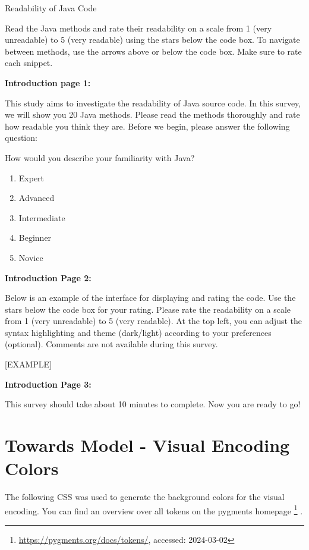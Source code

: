 \documentclass[%
class=scrreprt,
chapterprefix=false,%
open=right,%
twoside=true,%
paper=a4,%
logofile={Logo\_zentral\_farbig\_EN.png},%
thesistype=master,%
UKenglish,%
]{se2thesis}
\newcounter{urlfootnote}
\newcommand{\onecurl}[2]{%
	\stepcounter{urlfootnote}%
	\expandafter\def\csname urlfootnote:#1\endcsname{\theurlfootnote}%
	\footnote{\label{url:#1}\url{#1}, accessed: #2}%
}
\newcommand{\curl}[2]{%
		\onecurl{#1}{#2}%
}
\theoremstyle{definition}
\begin{document}
	Readability of Java Code
	
	Read the Java methods and rate their readability on a scale from 1 (very unreadable) to 5 (very readable) using the stars below the code box. To navigate between methods, use the arrows above or below the code box. Make sure to rate each snippet.
	
	\textbf{Introduction page 1:}
	
	This study aims to investigate the readability of Java source code. In this survey, we will show you 20 Java methods. Please read the methods thoroughly and rate how readable you think they are. Before we begin, please answer the following question:
	
	How would you describe your familiarity with Java?
	\begin{enumerate}
		\item Expert
		\item Advanced
		\item Intermediate
		\item Beginner
		\item Novice
	\end{enumerate}
	
	\pagebreak
	
	\textbf{Introduction Page 2:}
	
	Below is an example of the interface for displaying and rating the code. Use the stars below the code box for your rating. Please rate the readability on a scale from 1 (very unreadable) to 5 (very readable). At the top left, you can adjust the syntax highlighting and theme (dark/light) according to your preferences (optional). Comments are not available during this survey.
	
	[EXAMPLE]
	
	\textbf{Introduction Page 3:}
	
	This survey should take about 10 minutes to complete. Now you are ready to go! 


\chapter{Towards Model - Visual Encoding Colors}\label{appendix:model-visual-colors}	
	The following CSS was used to generate the background colors for the visual encoding. 
	You can find an overview over all tokens on the pygments homepage\curl{https://pygments.org/docs/tokens/}{2024-03-02}.

\end{document}
